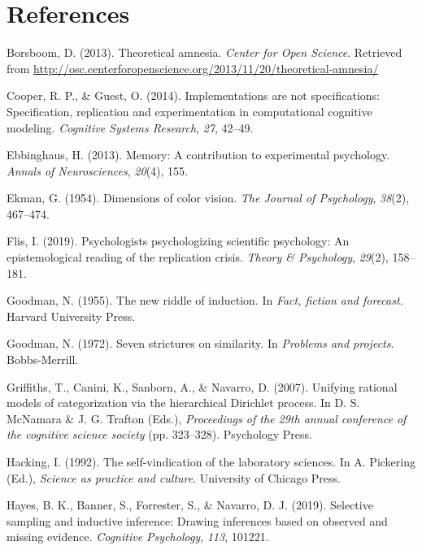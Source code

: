 \documentclass[
  english,
  doc]{apa6}
\begin{document}
\hypertarget{references}{%
\section{References}\label{references}}

\hypertarget{refs}{}
\leavevmode\hypertarget{ref-boorsbaum2013theoretical}{}%
Borsboom, D. (2013). Theoretical amnesia. \emph{Center for Open Science}. Retrieved from \url{http://osc.centerforopenscience.org/2013/11/20/theoretical-amnesia/}

\leavevmode\hypertarget{ref-cooper2014implementations}{}%
Cooper, R. P., \& Guest, O. (2014). Implementations are not specifications: Specification, replication and experimentation in computational cognitive modeling. \emph{Cognitive Systems Research}, \emph{27}, 42--49.

\leavevmode\hypertarget{ref-ebbinghaus2013memory}{}%
Ebbinghaus, H. (2013). Memory: A contribution to experimental psychology. \emph{Annals of Neurosciences}, \emph{20}(4), 155.

\leavevmode\hypertarget{ref-ekman1954dimensions}{}%
Ekman, G. (1954). Dimensions of color vision. \emph{The Journal of Psychology}, \emph{38}(2), 467--474.

\leavevmode\hypertarget{ref-Flis2019}{}%
Flis, I. (2019). Psychologists psychologizing scientific psychology: An epistemological reading of the replication crisis. \emph{Theory \& Psychology}, \emph{29}(2), 158--181.

\leavevmode\hypertarget{ref-goodman1955new}{}%
Goodman, N. (1955). The new riddle of induction. In \emph{Fact, fiction and forecast}. Harvard University Press.

\leavevmode\hypertarget{ref-goodman1972seven}{}%
Goodman, N. (1972). Seven strictures on similarity. In \emph{Problems and projects}. Bobbs-Merrill.

\leavevmode\hypertarget{ref-griffiths2007unifying}{}%
Griffiths, T., Canini, K., Sanborn, A., \& Navarro, D. (2007). Unifying rational models of categorization via the hierarchical Dirichlet process. In D. S. McNamara \& J. G. Trafton (Eds.), \emph{Proceedings of the 29th annual conference of the cognitive science society} (pp. 323--328). Psychology Press.

\leavevmode\hypertarget{ref-hacking1992self}{}%
Hacking, I. (1992). The self-vindication of the laboratory sciences. In A. Pickering (Ed.), \emph{Science as practice and culture}. University of Chicago Press.

\leavevmode\hypertarget{ref-hayes2019selective}{}%
Hayes, B. K., Banner, S., Forrester, S., \& Navarro, D. J. (2019). Selective sampling and inductive inference: Drawing inferences based on observed and missing evidence. \emph{Cognitive Psychology}, \emph{113}, 101221.
\end{document}
